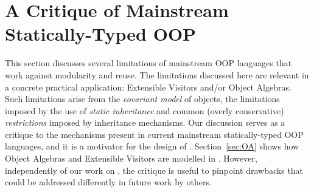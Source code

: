 \section{A Critique of Mainstream Statically-Typed OOP}
\label{sec:critique}

This section discusses several limitations of mainstream OOP languages
that work against modularity and reuse. The limitations discussed here
are relevant in a concrete practical application: Extensible Visitors and/or
Object Algebras. Such limitations arise from the \emph{covariant
  model} of objects, the limitations imposed by the use of
\emph{static inheritance} and common (overly conservative)
\emph{restrictions} imposed by inheritance mechanisms.  Our discussion
serves as a critique to the mechanisms present in current mainstream
statically-typed OOP languages, and it is a motivator for the design
of \name. Section~\ref{sec:OA} shows how Object Algebras and Extensible
Visitors are modelled in \name.  However, independently of our work on
\name, the critique is useful to pinpoint drawbacks that could be
addressed differently in future work by others.

